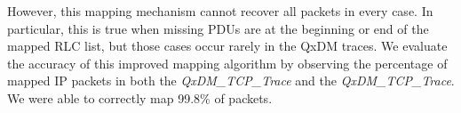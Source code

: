 
However, this mapping mechanism cannot recover all packets in every case. In particular, this is true when missing PDUs are at the beginning or end of the mapped RLC list, but those cases occur rarely in the QxDM traces. We evaluate the accuracy of this improved mapping algorithm by observing the percentage of mapped IP packets in both the \emph{QxDM\_{}TCP\_{}Trace} and the \emph{QxDM\_{}TCP\_{}Trace}. We were able to correctly map 99.8\% of packets. 



